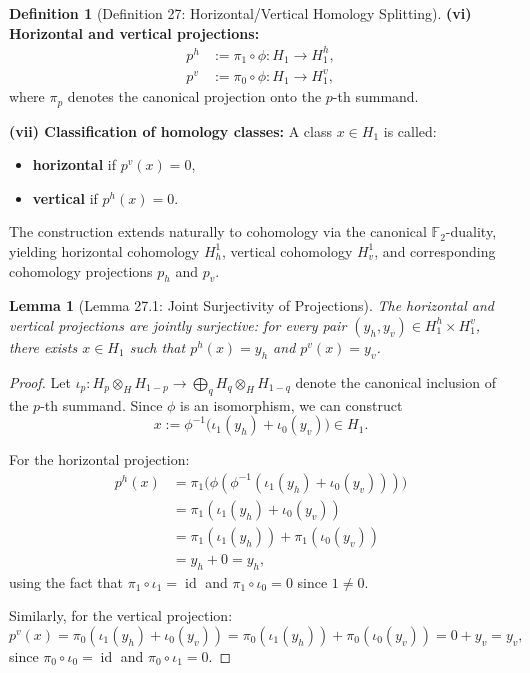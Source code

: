 \documentclass[11pt]{article}
\theoremstyle{plain}
\newtheorem*{lemma}{Lemma}
\theoremstyle{definition}
\newtheorem*{definition}{Definition}
\theoremstyle{remark}
\begin{document}
\begin{definition}[Definition 27: Horizontal/Vertical Homology Splitting]
\textbf{(vi) Horizontal and vertical projections:}
\begin{align}
p^h &:= \pi_1 \circ \phi : H_1 \to H_1^h, \\
p^v &:= \pi_0 \circ \phi : H_1 \to H_1^v,
\end{align}
where $\pi_p$ denotes the canonical projection onto the $p$-th summand.

\textbf{(vii) Classification of homology classes:} A class $x \in H_1$ is called:
\begin{itemize}
\item \textbf{horizontal} if $p^v(x) = 0$,
\item \textbf{vertical} if $p^h(x) = 0$.
\end{itemize}
\end{definition}

The construction extends naturally to cohomology via the canonical $\mathbb{F}_2$-duality, yielding horizontal cohomology $H^1_h$, vertical cohomology $H^1_v$, and corresponding cohomology projections $p_h$ and $p_v$.

\begin{lemma}[Lemma 27.1: Joint Surjectivity of Projections]
The horizontal and vertical projections are jointly surjective: for every pair $(y_h, y_v) \in H_1^h \times H_1^v$, there exists $x \in H_1$ such that $p^h(x) = y_h$ and $p^v(x) = y_v$.
\end{lemma}

\begin{proof}
Let $\iota_p : H_p \otimes_H H_{1-p} \to \bigoplus_q H_q \otimes_H H_{1-q}$ denote the canonical inclusion of the $p$-th summand. Since $\phi$ is an isomorphism, we can construct
\[
x := \phi^{-1}\!\bigl(\iota_1(y_h) + \iota_0(y_v)\bigr) \in H_1.
\]

For the horizontal projection:
\begin{align}
p^h(x) &= \pi_1\!\bigl(\phi(\phi^{-1}(\iota_1(y_h) + \iota_0(y_v)))\bigr) \\
&= \pi_1(\iota_1(y_h) + \iota_0(y_v)) \\
&= \pi_1(\iota_1(y_h)) + \pi_1(\iota_0(y_v)) \\
&= y_h + 0 = y_h,
\end{align}
using the fact that $\pi_1 \circ \iota_1 = \operatorname{id}$ and $\pi_1 \circ \iota_0 = 0$ since $1 \neq 0$.

Similarly, for the vertical projection:
\[
p^v(x) = \pi_0(\iota_1(y_h) + \iota_0(y_v)) = \pi_0(\iota_1(y_h)) + \pi_0(\iota_0(y_v)) = 0 + y_v = y_v,
\]
since $\pi_0 \circ \iota_0 = \operatorname{id}$ and $\pi_0 \circ \iota_1 = 0$.
\end{proof}
\end{document}
